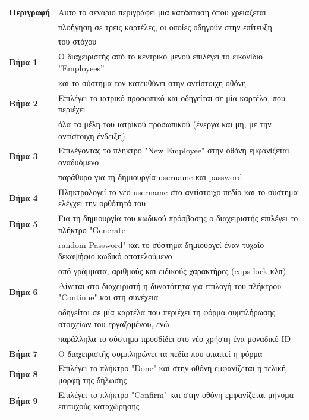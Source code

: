 \documentclass{article}
\newcommand\T{\rule{0pt}{2.6ex}}       %
\newcommand\B{\rule[-1.2ex]{0pt}{0pt}}
\begin{document}
 \begin{center}
     \begin{tabular}{|l|l|}
     \hline
      \textbf{Περιγραφή} & Αυτό το σενάριο περιγράφει μια κατάσταση όπου χρειάζεται \T \\& πλοήγηση σε τρεις καρτέλες, οι οποίες οδηγούν στην επίτευξη \\& του στόχου \B \\ 
      \hline
      \textbf{Βήμα 1} & Ο διαχειριστής από το κεντρικό μενού επιλέγει το εικονίδιο ”Employees” \T \\& και το σύστημα τον κατευθύνει στην αντίστοιχη οθόνη \B \\
      \hline
      \textbf{Βήμα 2} & Επιλέγει το ιατρικό προσωπικό και οδηγείται σε μία καρτέλα, που περιέχει \T \\& όλα τα μέλη του ιατρικού προσωπικού (ένεργα και μη, με την αντίστοιχη ένδειξη) \B \\
      \hline
      \textbf{Βήμα 3} & Επιλέγοντας το πλήκτρο "New Employee" στην οθόνη εμφανίζεται αναδυόμενο \T \\& παράθυρο για τη δημιουργία username και password \B \\
      \hline
      \textbf{Βήμα 4} & Πληκτρολογεί το νέο username στο αντίστοιχο πεδίο και το σύστημα ελέγχει την ορθότητά του \T\B \\
      \hline
      \textbf{Βήμα 5} &  Για τη δημιουργία του κωδικού πρόσβασης ο διαχειριστής επιλέγει το πλήκτρο "Generate \T \\& random Password" και το σύστημα δημιουργεί έναν τυχαίο δεκαψήφιο κωδικό αποτελούμενο \\& από γράμματα, αριθμούς και ειδικούς χαρακτήρες (caps lock κλπ) \B \\
      \hline
      \textbf{Βήμα 6} & Δίνεται στο διαχειριστή η δυνατότητα για επιλογή του πλήκτρου "Continue" και στη συνέχεια 
      \T \\& οδηγείται σε μία καρτέλα που περιέχει τη φόρμα συμπλήρωσης στοιχείων του εργαζομένου, ενώ \\& παράλληλα το σύστημα προσδίδει στο νέο χρήστη ένα μοναδικό ID \B \\
      \hline
      \textbf{Βήμα 7} & Ο διαχειριστής συμπληρώνει τα πεδία που απαιτεί η φόρμα \T\B \\
      \hline
       \textbf{Βήμα 8} & Επιλέγει το πλήκτρο "Done" και στην οθόνη εμφανίζεται η τελική μορφή της δήλωσης \T\B \\
      \hline
      \textbf{Βήμα 9} & Επιλέγει το πλήκτρο "Confirm" και στην οθόνη εμφανίζεται μήνυμα επιτυχούς καταχώρησης\T\B \\
      \hline
     \end{tabular}
 \end{center}
 
\end{document}
